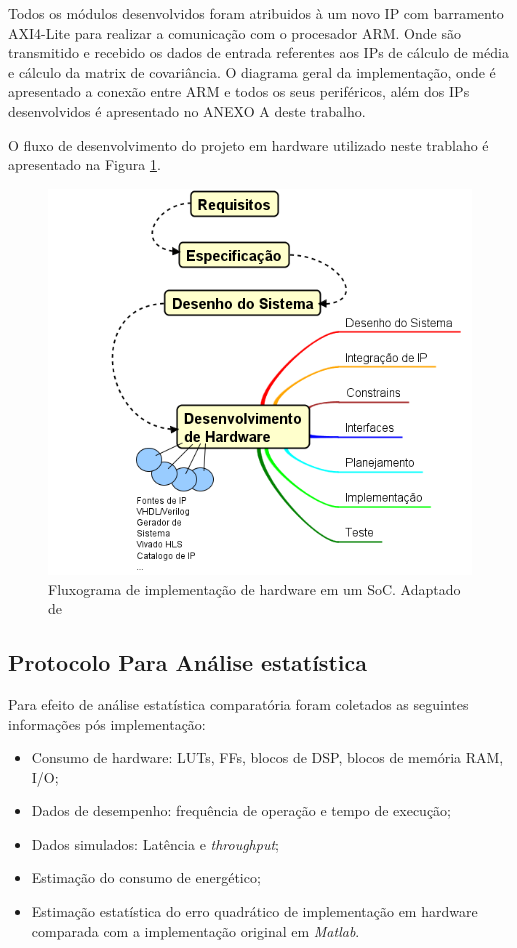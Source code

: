 Todos os módulos desenvolvidos foram atribuidos à um novo IP com barramento AXI4-Lite para realizar a comunicação com o procesador ARM. Onde são transmitido e recebido os dados de entrada referentes aos IPs de cálculo de média e cálculo da matrix de covariância. O diagrama geral da implementação, onde é apresentado a conexão entre ARM e todos os seus periféricos, além dos IPs desenvolvidos é apresentado no ANEXO A deste trabalho.

O fluxo de desenvolvimento do projeto em hardware utilizado neste trablaho é apresentado na Figura \ref{diagram_hardware}.

\begin{figure}[h]
  \centering
  \includegraphics[keepaspectratio=true,scale=1.0]{figuras/fluxograma_hardware.PNG}
  \caption{Fluxograma de implementação de hardware em um SoC. Adaptado de \cite{zynqBook}}
  \label{diagram_hardware}
\end{figure}

\subsection{Protocolo Para Análise estatística}
Para efeito de análise estatística comparatória foram coletados as seguintes informações pós implementação:

\begin{itemize}[noitemsep]
	\item Consumo de hardware: LUTs, FFs, blocos de DSP, blocos de memória RAM, I/O;
	\item Dados de desempenho: frequência de operação e tempo de execução;
	\item Dados simulados: Latência e \textit{throughput};
	\item Estimação do consumo de energético;
	\item Estimação estatística do erro quadrático de implementação em hardware comparada com a implementação original em \textit{Matlab}.
\end{itemize}

